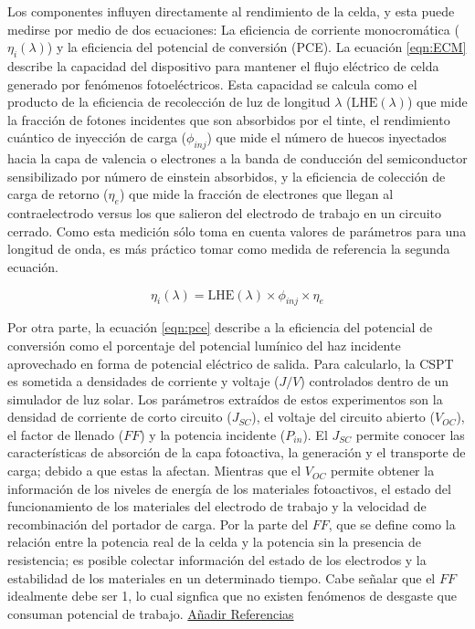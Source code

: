 Los componentes influyen directamente al rendimiento de la celda, y esta puede medirse por medio de dos ecuaciones: La eficiencia de corriente monocromática ($\eta_{i} (\lambda)$) y la eficiencia del potencial de conversión (PCE). La  ecuación \ref{eqn:ECM} describe la capacidad del dispositivo para mantener el flujo eléctrico de celda generado por fenómenos fotoeléctricos. Esta capacidad se calcula como el producto de la eficiencia de recolección de luz de longitud $\lambda$ ($\text{LHE}(\lambda)$) que mide la fracción de fotones incidentes que son absorbidos por el tinte, el rendimiento cuántico de inyección de carga ($\phi_{inj}$) que mide el número de huecos inyectados hacia la capa de valencia o electrones a la banda de conducción del semiconductor sensibilizado por número de einstein absorbidos, y la eficiencia de colección de carga de retorno ($\eta_e$) que mide la fracción de electrones que llegan al contraelectrodo versus los que salieron del electrodo de trabajo en un circuito cerrado. Como esta medición sólo toma en cuenta valores de parámetros para una longitud de onda, es más práctico tomar como medida de referencia la segunda ecuación.


\begin{equation}
    \eta_{i}(\lambda) = \text{LHE}(\lambda)\times \phi_{inj} \times \eta_e
    \label{eqn:ECM}
\end{equation}

Por otra parte, la  ecuación \ref{eqn:pce} describe a la eficiencia del potencial de conversión como el porcentaje del potencial lumínico del haz incidente aprovechado en forma de potencial eléctrico de salida. Para calcularlo, la CSPT es sometida a densidades de corriente y voltaje ($J/V$) controlados dentro de un simulador de luz solar. Los parámetros extraídos de estos experimentos son la densidad de corriente de corto circuito ($J_{SC}$), el voltaje del circuito abierto ($V_{OC}$), el factor de llenado ($FF$) y la potencia incidente ($P_{in}$). El $J_{SC}$ permite conocer las características de absorción de la capa fotoactiva, la generación y el transporte de carga; debido a que estas la afectan. Mientras que el $V_{OC}$ permite obtener la información de los niveles de energía de los materiales fotoactivos, el estado del funcionamiento de los materiales del electrodo de trabajo y la velocidad de recombinación del portador de carga. Por la parte del $FF$, que se define como la relación entre la potencia real de la celda y la potencia sin la presencia de resistencia; es posible colectar información del estado de los electrodos y la estabilidad de los materiales en un determinado tiempo. Cabe señalar que el $FF$ idealmente debe ser 1, lo cual signfica que no existen fenómenos de desgaste que consuman potencial de trabajo. \underline{Añadir Referencias}

